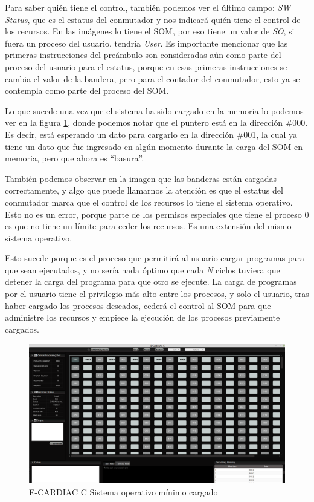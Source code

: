 \documentclass[letterpaper,12pt,oneside]{book}
\begin{document}
        Para saber quién tiene el control, también podemos ver el último campo: \textit{SW Status}, que es el estatus del conmutador y nos indicará 
        quién tiene
		el control de los recursos. En las imágenes lo tiene el SOM, por eso tiene un valor de \textit{SO}, si fuera un proceso del usuario, tendría \textit{User}. Es
		importante mencionar que las primeras instrucciones del preámbulo son consideradas aún como parte del proceso del usuario para el estatus, 
		porque
		en esas primeras instrucciones se cambia el valor de la bandera, pero para el contador del conmutador, esto ya se contempla como parte del
		proceso del SOM.
		
		Lo que sucede una vez que el sistema ha sido cargado en la memoria lo podemos ver en la figura \ref{fig:eccSOMcargado}, donde podemos notar que 
		el
		puntero está en la dirección \#000. Es decir, está esperando un dato para cargarlo en la dirección \#001, la cual ya tiene un dato que fue
		ingresado
		en algún momento durante la carga del SOM en memoria, pero que ahora es ``basura''.
  
        También podemos observar en la imagen que las banderas están cargadas correctamente, y algo que puede llamarnos la atención
		es que el estatus del conmutador marca que el control de los recursos lo tiene el sistema operativo. Esto no es un error, porque parte de los 
		permisos especiales
		que tiene el proceso 0 es que no tiene un límite para ceder los recursos. Es una extensión del mismo sistema operativo. 
  
        Esto sucede porque es el proceso que permitirá
		al usuario cargar programas para que sean ejecutados, y no sería nada óptimo que cada \textit{N} ciclos tuviera que detener la carga del 
		programa para que otro se ejecute.
		La carga de programas por el usuario tiene el privilegio más alto entre los procesos, y solo el usuario, tras haber cargado los procesos 
		deseados, cederá el control al SOM para que administre los recursos y empiece la ejecución de los procesos previamente cargados.
		
		\begin{figure}[h]		
			\centering
			\includegraphics[scale=0.25]{media/CARDIACC/ECARDIACC_socargado.png}
			\caption{E-CARDIAC C Sistema operativo mínimo cargado}
			\label{fig:eccSOMcargado}
		\end{figure}
		
\end{document}
